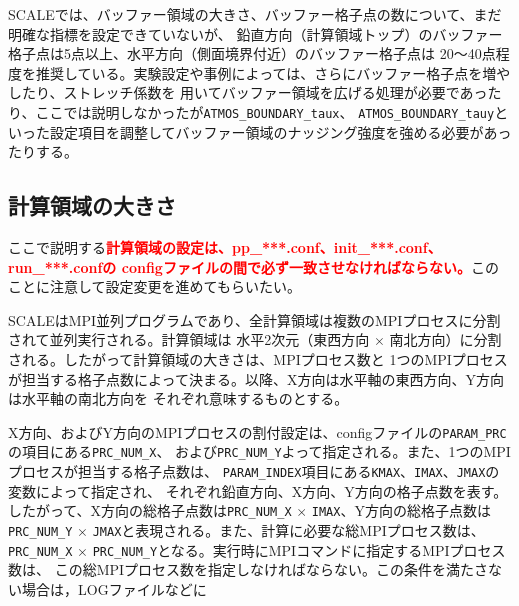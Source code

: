 SCALEでは、バッファー領域の大きさ、バッファー格子点の数について、まだ明確な指標を設定できていないが、
鉛直方向（計算領域トップ）のバッファー格子点は5点以上、水平方向（側面境界付近）のバッファー格子点は
20〜40点程度を推奨している。実験設定や事例によっては、さらにバッファー格子点を増やしたり、ストレッチ係数を
用いてバッファー領域を広げる処理が必要であったり、ここでは説明しなかったが\verb|ATMOS_BOUNDARY_taux|、
\verb|ATMOS_BOUNDARY_tauy|といった設定項目を調整してバッファー領域のナッジング強度を強める必要があったりする。



\subsection{計算領域の大きさ} \label{sec:adv_domainsize}
ここで説明する\textcolor{red}{\bf 計算領域の設定は、pp\_***.conf、init\_***.conf、run\_***.confの
configファイルの間で必ず一致させなければならない。}このことに注意して設定変更を進めてもらいたい。

SCALEはMPI並列プログラムであり、全計算領域は複数のMPIプロセスに分割されて並列実行される。計算領域は
水平2次元（東西方向 $\times$ 南北方向）に分割される。したがって計算領域の大きさは、MPIプロセス数と
1つのMPIプロセスが担当する格子点数によって決まる。以降、X方向は水平軸の東西方向、Y方向は水平軸の南北方向を
それぞれ意味するものとする。

X方向、およびY方向のMPIプロセスの割付設定は、configファイルの\verb|PARAM_PRC|の項目にある\verb|PRC_NUM_X|、
および\verb|PRC_NUM_Y|よって指定される。また、1つのMPIプロセスが担当する格子点数は、
\verb|PARAM_INDEX|項目にある\verb|KMAX|、\verb|IMAX|、\verb|JMAX|の変数によって指定され、
それぞれ鉛直方向、X方向、Y方向の格子点数を表す。
したがって、X方向の総格子点数は\verb|PRC_NUM_X| $\times$ \verb|IMAX|、Y方向の総格子点数は
\verb|PRC_NUM_Y| $\times$ \verb|JMAX|と表現される。また、計算に必要な総MPIプロセス数は、
\verb|PRC_NUM_X| $\times$ \verb|PRC_NUM_Y|となる。実行時にMPIコマンドに指定するMPIプロセス数は、
この総MPIプロセス数を指定しなければならない。この条件を満たさない場合は，LOGファイルなどに\\

\\

